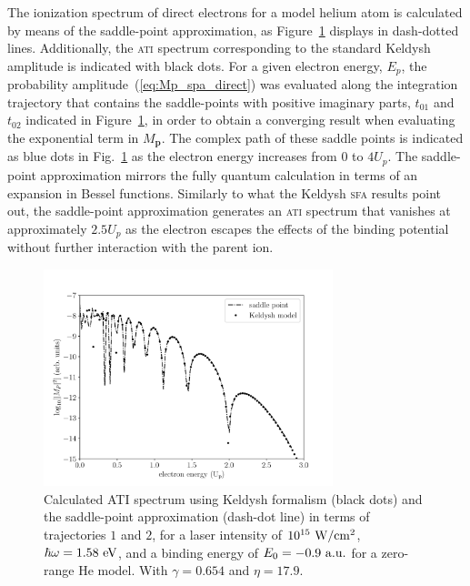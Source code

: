 The ionization spectrum of direct electrons for a model helium atom is
calculated by means of the saddle-point approximation, as
Figure~\ref{fig:sp_direct} displays in dash-dotted
lines. Additionally, the \textsc{ati} spectrum corresponding to the
standard Keldysh amplitude is indicated with black dots. For a given
electron energy, $E_{p}$, the probability
amplitude~(\ref{eq:Mp_spa_direct}) was evaluated along the integration
trajectory that contains the saddle-points with positive imaginary
parts, $t_{01}$ and $t_{02}$ indicated in Figure~\ref{fig:sp_direct},
in order to obtain a converging result when evaluating the exponential
term in $M_{\mathbf{p}}$. The complex path of these saddle points is
indicated as blue dots in Fig.~\ref{fig:sp_direct} as the electron
energy increases from $0$ to $4 U_{p}$. The saddle-point approximation
mirrors the fully quantum calculation in terms of an expansion in
Bessel functions. Similarly to what the Keldysh \textsc{sfa} results
point out, the saddle-point approximation generates an \textsc{ati}
spectrum that vanishes at approximately $2.5 U_{p}$ as the electron
escapes the effects of the binding potential without further
interaction with the parent ion.

\begin{figure}
  \centering
  \includegraphics[width = 0.75\textwidth]{figures/ch_ATI_SPA/direct/SPvsKeldysh}
  \caption{Calculated ATI spectrum using Keldysh formalism (black
    dots) and the saddle-point approximation (dash-dot line) in terms
    of trajectories $1$ and $2$, for a laser intensity of
    $10^{15}\ \rm{W/cm^{2}}$, $\hbar\omega = 1.58\ \rm{eV}$, and a
    binding energy of $E_{0} = -0.9\ \rm{a.u.}$ for a zero-range He
    model. With $\gamma = 0.654$ and $\eta = 17.9$.}
  \label{fig:sp_direct}
\end{figure}


